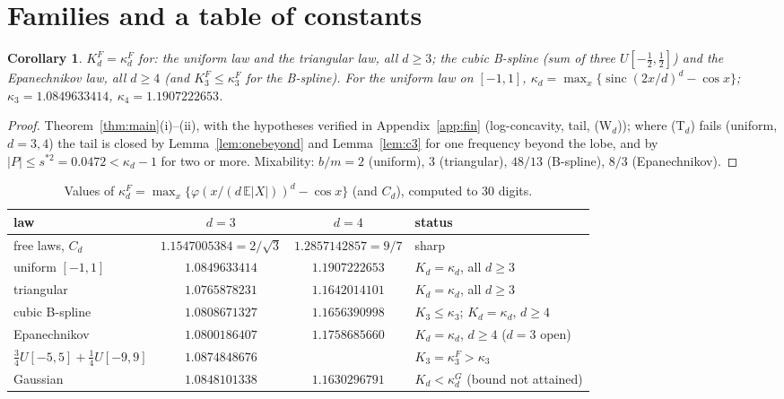 \documentclass[11pt]{amsart}
\newtheorem{corollary}[theorem]{Corollary}\newtheorem{conjecture}[theorem]{Conjecture}
\theoremstyle{definition}\newtheorem{definition}[theorem]{Definition}\theoremstyle{remark}\newtheorem{remark}[theorem]{Remark}
\newcommand{\sinc}{\operatorname{sinc}}\newcommand{\E}{\mathbb E}\newcommand{\cx}{\le_{\mathrm{cx}}}
\begin{document}
\section{Families and a table of constants}
\begin{corollary}\label{cor:families}
$K_d^F=\kappa_d^F$ for: the uniform law and the triangular law, all $d\ge3$; the cubic B-spline (sum of three $U[-\frac12,\frac12]$) and the Epanechnikov
law, all $d\ge4$ (and $K_3^F\le\kappa_3^F$ for the B-spline). For the uniform law on $[-1,1]$, $\kappa_d=\max_x\{\sinc(2x/d)^d-\cos x\}$;
$\kappa_3=1.0849633414$, $\kappa_4=1.1907222653$.
\end{corollary}
\begin{proof}Theorem~\ref{thm:main}(i)--(ii), with the hypotheses verified in Appendix~\ref{app:fin} (log-concavity, tail, (W$_d$)); where (T$_d$) fails
(uniform, $d=3,4$) the tail is closed by Lemma~\ref{lem:onebeyond} and Lemma~\ref{lem:c3} for one frequency beyond the lobe, and by $|P|\le s^{*2}=0.0472<\kappa_d-1$ for two or more. Mixability: $b/m=2$ (uniform), $3$ (triangular), $48/13$ (B-spline),
$8/3$ (Epanechnikov).\end{proof}
\begin{table}[h]\centering\small
\begin{tabular}{lccl}\toprule
law & $d=3$ & $d=4$ & status\\\midrule
free laws, $C_d$ & $1.1547005384=2/\sqrt3$ & $1.2857142857=9/7$ & sharp\\
uniform $[-1,1]$ & $1.0849633414$ & $1.1907222653$ & $K_d=\kappa_d$, all $d\ge3$\\
triangular & $1.0765878231$ & $1.1642014101$ & $K_d=\kappa_d$, all $d\ge3$\\
cubic B-spline & $1.0808671327$ & $1.1656390998$ & $K_3\le\kappa_3$; $K_d=\kappa_d$, $d\ge4$\\
Epanechnikov & $1.0800186407$ & $1.1758685660$ & $K_d=\kappa_d$, $d\ge4$ ($d=3$ open)\\
$\frac34U[-5,5]+\frac14U[-9,9]$ & $1.0874848676$ & & $K_3=\kappa_3^{F}>\kappa_3$\\
Gaussian & $1.0848101338$ & $1.1630296791$ & $K_d<\kappa_d^G$ (bound not attained)\\\bottomrule
\end{tabular}
\caption{Values of $\kappa_d^F=\max_x\{\varphi(x/(d\,\E|X|))^d-\cos x\}$ (and $C_d$), computed to 30 digits.}\label{tab:const}
\end{table}
\end{document}
